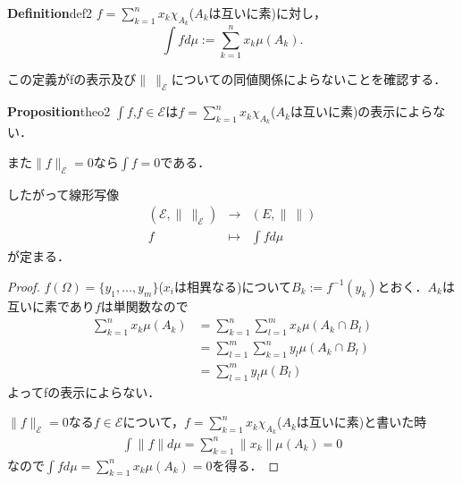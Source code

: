 \documentclass[dvipdfmx,autodetect-engine]{jbook}
\begin{document}
  \begin{mydef}{\textbf{Definition}}{def2}
    $f=\sum_{k=1}^{n}x_k \chi_{A_k}$($A_k$は互いに素)に対し，
    \begin{equation*}
      \int f d\mu := \sum_{k=1}^{n}x_k \mu\left(A_k\right).
    \end{equation*}
  \end{mydef}

  この定義がfの表示及び$\|\ \|_{\mathcal{E}}$についての同値関係によらないことを確認する．

  \begin{mytheo}{\textbf{Proposition}}{theo2}
    $\int f$,$f\in \mathcal{E}$は$f=\sum_{k=1}^{n}x_k \chi_{A_k}$($A_{k}$は互いに素)の表示によらない．　\par
    また$\|f\|_{\mathcal{E}}=0$なら$\int f=0$である．\par
    したがって線形写像
    \begin{equation*}
      \begin{array}{ccc}
          (\mathcal{E},\|\ \|_{\mathcal{E}}) & {\longrightarrow} & (E,\|\ \|) \\
          f & \longmapsto & \int fd\mu
      \end{array}
    \end{equation*}
    が定まる．
  \end{mytheo}
  \begin{proof}
    $f(\Omega)=\{y_1,\ldots,y_m\}$($x_i$は相異なる)について$B_k:=f^{-1}(y_k)$とおく．$A_{k}$は互いに素であり$f$は単関数なので
    \begin{align*}
      \sum_{k=1}^{n}x_k \mu\left(A_k\right) &= \sum_{k=1}^{n} \sum_{l=1}^{m} x_k \mu\left(A_k\cap B_l\right) \\
                                            &= \sum_{l=1}^{m} \sum_{k=1}^{n} y_l \mu\left(A_k\cap B_l\right) \\
                                            &= \sum_{l=1}^{m} y_l \mu\left(B_l\right)
    \end{align*}
    よってfの表示によらない．\par
    $\|f\|_{\mathcal{E}}=0$なる$f\in\mathcal{E}$について，$f=\sum_{k=1}^{n}x_k \chi_{A_k}$($A_{k}$は互いに素)と書いた時
    \begin{align*}
      \int \|f\| d\mu = \sum_{k=1}^{n}\|x_k\|\mu\left(A_k\right) = 0
    \end{align*}
    なので$\int f d\mu = \sum_{k=1}^{n}x_k\mu\left(A_k\right)=0$を得る．
  \end{proof}
\end{document}
